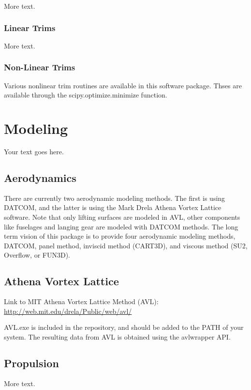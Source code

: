 \documentclass[11pt]{article} %
\begin{document}
More text.

\subsubsection{Linear Trims}

More text.

\subsubsection{Non-Linear Trims}

Various nonlinear trim routines are available in this software package. Thses are available through the scipy.optimize.minimize function. 

\section{Modeling}

Your text goes here.

\subsection{Aerodynamics}

There are currently two aerodynamic modeling methods. The first is using DATCOM, and the latter is using the Mark Drela Athena Vortex Lattice software. Note that only lifting surfaces are modeled in AVL, other components like fuselages and langing gear are modeled with DATCOM methods. The long term vision of this package is to provide four aerodynamic modeling methods, DATCOM, panel method, inviscid method (CART3D), and viscous method (SU2, Overflow, or FUN3D).

\subsection{Athena Vortex Lattice}

Link to MIT Athena Vortex Lattice Method (AVL): \\
\url{http://web.mit.edu/drela/Public/web/avl/}

AVL.exe is included in the repository, and should be added to the PATH of your system. The resulting data from AVL is obtained using the avlwrapper API. 

\subsection{Propulsion}

More text.
\end{document}
